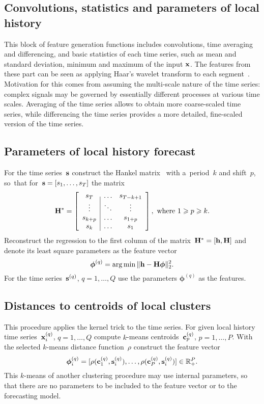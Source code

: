 \documentclass[conference]{IEEEtran}
\begin{document}
\subsection{Convolutions, statistics and parameters of local history}\label{sc:Conv}
This block of feature generation functions includes convolutions, time averaging and differencing, and basic statistics of each time series, such as mean and standard deviation, minimum and maximum of the input ${\mathbf{x}}$. The features from these part can be seen as applying Haar's wavelet transform to each segment~\cite{Jiang2011}. Motivation for this comes from assuming the multi-scale nature of the time series: complex signals may be governed by essentially different processes at various time scales. Averaging of the time series allows to obtain more coarse-scaled time series, while differencing the time series provides a more detailed, fine-scaled version of the time series.


\subsection{Parameters of local history forecast}
For the time series~${\mathbf{s}}$ construct the Hankel matrix~\cite{Motrenko2016} with a~period~$k$ and shift~$p$, so~that for~${\mathbf{s}} = [s_1,\dots,s_T]$ the matrix
\[
\mathbf{H}^* =
\left[ \begin{array}{c|cc}
s_T  & \dots & s_{T-k+1} \\
\vdots & \ddots & \vdots \\
s_{k+p} & \dots & s_{1+p}\\
s_k & \dots & s_1 \\
\end{array}
\right],
\text{~where~} 1\geqslant p \geqslant k .
\]
Reconstruct the regression to the first column of the matrix~$\mathbf{H}^*=[{\mathbf{h}}, \mathbf{H}]$ and denote its least square parameters as the feature vector
\begin{equation}\label{eq:SSA}
\boldsymbol{\phi}^{(q)} = \arg\min \| \bh-\bH \boldsymbol{\phi}\|_2^2.
\end{equation}
For the time series~${\mathbf{s}}^{(q)}$, $q=1,\dots, Q$ use the parameters $\boldsymbol{\phi}^{(q)}$ as the features.

\subsection{Distances to centroids of local clusters}\label{sc:centroids}
This procedure applies the kernel trick to the time series. For given local history time series~${\mathbf{x}}_i^{(q)}$, $q=1,\dots, Q$ compute $k$-means centroids~${\mathbf{c}}_p^{(q)}$, $p = 1, \dots, P$.  With the selected $k$-means distance function~$\rho$ construct the feature vector
\begin{equation}\label{eq:centroids}
\vf_i^{(q)} = [\rho(\bc_1^{(q)},\bs_i^{(q)}),\dots,\rho(\bc^{(q)}_P,\bs_i^{(q)})] \in \R_+^P.
\end{equation}
This $k$-means of another clustering procedure may use internal parameters, so that there are no parameters to be included to the feature vector or to the forecasting model.
\end{document}
